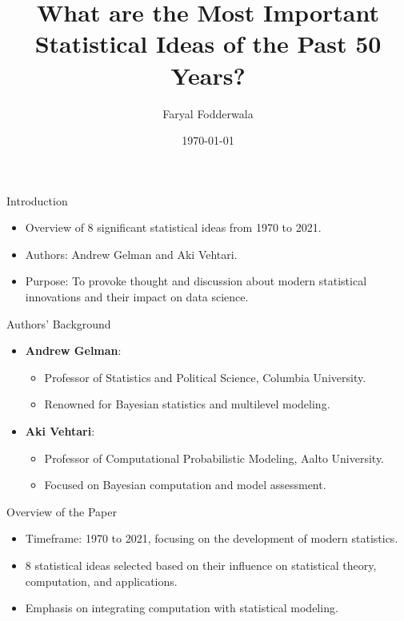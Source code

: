 \documentclass{beamer}
\title{What are the Most Important Statistical Ideas of the Past 50 Years?}
\author{Faryal Fodderwala}
\date{\today}
\begin{document}
\frame{\titlepage}

\begin{frame}{Introduction}
\begin{itemize}
    \item Overview of 8 significant statistical ideas from 1970 to 2021.
    \item Authors: Andrew Gelman and Aki Vehtari.
    \item Purpose: To provoke thought and discussion about modern statistical innovations and their impact on data science.
\end{itemize}
\end{frame}

\begin{frame}{Authors' Background}
\begin{itemize}
    \item \textbf{Andrew Gelman}:
        \begin{itemize}
            \item Professor of Statistics and Political Science, Columbia University.
            \item Renowned for Bayesian statistics and multilevel modeling.
        \end{itemize}
    \item \textbf{Aki Vehtari}:
        \begin{itemize}
            \item Professor of Computational Probabilistic Modeling, Aalto University.
            \item Focused on Bayesian computation and model assessment.
        \end{itemize}
\end{itemize}
\end{frame}

\begin{frame}{Overview of the Paper}
\begin{itemize}
    \item Timeframe: 1970 to 2021, focusing on the development of modern statistics.
    \item 8 statistical ideas selected based on their influence on statistical theory, computation, and applications.
    \item Emphasis on integrating computation with statistical modeling.
\end{itemize}
\end{frame}
\end{document}
